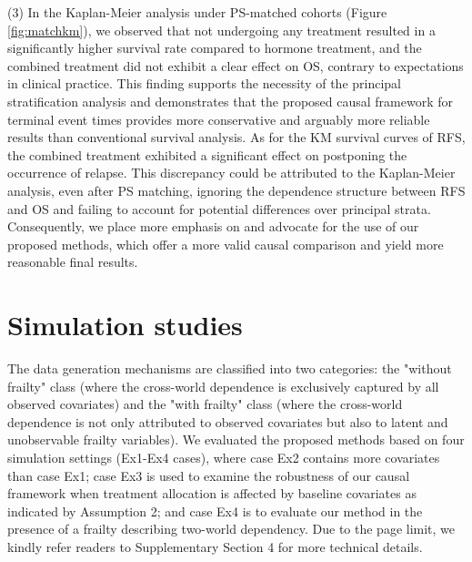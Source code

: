 \documentclass[APA,Times1COL]{WileyNJDv5} %
\theoremstyle{plain}
\begin{document}
(3) In the Kaplan-Meier analysis under PS-matched cohorts (Figure \ref{fig:matchkm}), we observed that not undergoing any treatment resulted in a significantly higher survival rate compared to hormone treatment, and the combined treatment did not exhibit a clear effect on OS, contrary to expectations in clinical practice. {This finding supports the necessity of the principal stratification analysis and demonstrates that the proposed causal framework for terminal event times provides more conservative and arguably more reliable results than conventional survival analysis.} As for the KM survival curves of RFS, the combined treatment exhibited a significant effect on postponing the occurrence of relapse. This discrepancy could be attributed to the Kaplan-Meier analysis, even after PS matching, ignoring the dependence structure between RFS and OS and failing to account for potential differences over principal strata. Consequently, we place more emphasis on and advocate for the use of our proposed methods, which offer a more valid causal comparison and yield more reasonable final results.



\section{Simulation studies}
\label{sec:simulation}


The data generation mechanisms are classified into two categories: the "without frailty" class (where the cross-world dependence is exclusively captured by all observed covariates) and the "with frailty" class (where the cross-world dependence is not only attributed to observed covariates but also to latent and unobservable frailty variables). 
We evaluated the proposed methods based on four simulation settings (Ex1-Ex4 cases), where case Ex2 contains more covariates than case Ex1; case Ex3 is used to examine the robustness of our causal framework when treatment allocation is affected by baseline covariates as indicated by Assumption 2; and case Ex4 is to evaluate our method in the presence of a frailty describing two-world dependency. Due to the page limit, we kindly refer readers to Supplementary Section 4 for more technical details.
\end{document}

